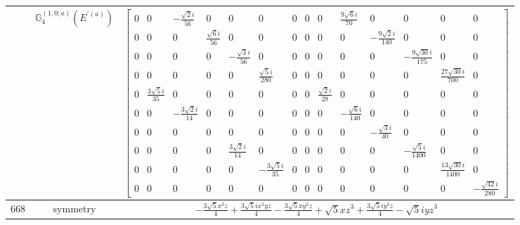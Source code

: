 \documentclass[fleqn,8pt,landscape]{jsarticle}
\begin{document}
\begin{longtable}{ccc}
$  $ & $ \mathbb{G}_{4}^{(1,0;a)}(E^{\prime(a)}) $ & $ \begin{bmatrix} 0 & 0 & - \frac{\sqrt{2} i}{56} & 0 & 0 & 0 & 0 & 0 & 0 & \frac{9 \sqrt{6} i}{70} & 0 & 0 & 0 & 0 \\ 0 & 0 & 0 & \frac{\sqrt{6} i}{56} & 0 & 0 & 0 & 0 & 0 & 0 & - \frac{9 \sqrt{2} i}{140} & 0 & 0 & 0 \\ 0 & 0 & 0 & 0 & - \frac{\sqrt{3} i}{56} & 0 & 0 & 0 & 0 & 0 & 0 & - \frac{9 \sqrt{30} i}{175} & 0 & 0 \\ 0 & 0 & 0 & 0 & 0 & \frac{\sqrt{5} i}{280} & 0 & 0 & 0 & 0 & 0 & 0 & \frac{27 \sqrt{30} i}{700} & 0 \\ 0 & \frac{3 \sqrt{5} i}{35} & 0 & 0 & 0 & 0 & 0 & 0 & \frac{\sqrt{2} i}{28} & 0 & 0 & 0 & 0 & 0 \\ 0 & 0 & - \frac{3 \sqrt{2} i}{14} & 0 & 0 & 0 & 0 & 0 & 0 & - \frac{\sqrt{6} i}{140} & 0 & 0 & 0 & 0 \\ 0 & 0 & 0 & 0 & 0 & 0 & 0 & 0 & 0 & 0 & - \frac{\sqrt{3} i}{40} & 0 & 0 & 0 \\ 0 & 0 & 0 & 0 & \frac{3 \sqrt{2} i}{14} & 0 & 0 & 0 & 0 & 0 & 0 & - \frac{\sqrt{5} i}{1400} & 0 & 0 \\ 0 & 0 & 0 & 0 & 0 & - \frac{3 \sqrt{5} i}{35} & 0 & 0 & 0 & 0 & 0 & 0 & \frac{13 \sqrt{30} i}{1400} & 0 \\ 0 & 0 & 0 & 0 & 0 & 0 & 0 & 0 & 0 & 0 & 0 & 0 & 0 & - \frac{\sqrt{42} i}{280} \end{bmatrix} $ \\ \hline
$ 668 $ & $ \text{symmetry} $ & $ - \frac{3 \sqrt{5} x^{3} z}{4} + \frac{3 \sqrt{5} i x^{2} y z}{4} - \frac{3 \sqrt{5} x y^{2} z}{4} + \sqrt{5} x z^{3} + \frac{3 \sqrt{5} i y^{3} z}{4} - \sqrt{5} i y z^{3} $ \\

\end{longtable}
\end{document}
